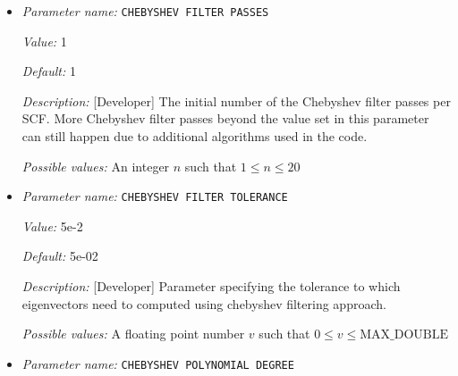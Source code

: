 \begin{itemize}
{\it Default:} 0


{\it Description:} [Developer] Sets the number of OpenMP threads to be used in the blas linear algebra calls inside the Chebyshev filtering. The default value is 0, for which no action is taken. CAUTION: For non zero values, CHEBYSHEV FILTER NUM OMP THREADS takes precedence over the OMP\_NUM\_THREADS environment variable.


{\it Possible values:} An integer $n$ such that $0\leq n \leq 300$
\item {\it Parameter name:} {\tt CHEBYSHEV FILTER PASSES}
\label{parameters:SCF parameters/Eigen_2dsolver_2fChebyshev solver related parameters/CHEBYSHEV FILTER PASSES}
\label{parameters:SCF_20parameters/Eigen_2dsolver_2fChebyshev_20solver_20related_20parameters/CHEBYSHEV_20FILTER_20PASSES}


{\it Value:} 1


{\it Default:} 1


{\it Description:} [Developer] The initial number of the Chebyshev filter passes per SCF. More Chebyshev filter passes beyond the value set in this parameter can still happen due to additional algorithms used in the code.


{\it Possible values:} An integer $n$ such that $1\leq n \leq 20$
\item {\it Parameter name:} {\tt CHEBYSHEV FILTER TOLERANCE}
\label{parameters:SCF parameters/Eigen_2dsolver_2fChebyshev solver related parameters/CHEBYSHEV FILTER TOLERANCE}
\label{parameters:SCF_20parameters/Eigen_2dsolver_2fChebyshev_20solver_20related_20parameters/CHEBYSHEV_20FILTER_20TOLERANCE}


{\it Value:} 5e-2


{\it Default:} 5e-02


{\it Description:} [Developer] Parameter specifying the tolerance to which eigenvectors need to computed using chebyshev filtering approach.


{\it Possible values:} A floating point number $v$ such that $0 \leq v \leq \text{MAX\_DOUBLE}$
\item {\it Parameter name:} {\tt CHEBYSHEV POLYNOMIAL DEGREE}
\label{parameters:SCF parameters/Eigen_2dsolver_2fChebyshev solver related parameters/CHEBYSHEV POLYNOMIAL DEGREE}
\label{parameters:SCF_20parameters/Eigen_2dsolver_2fChebyshev_20solver_20related_20parameters/CHEBYSHEV_20POLYNOMIAL_20DEGREE}



\end{itemize}
